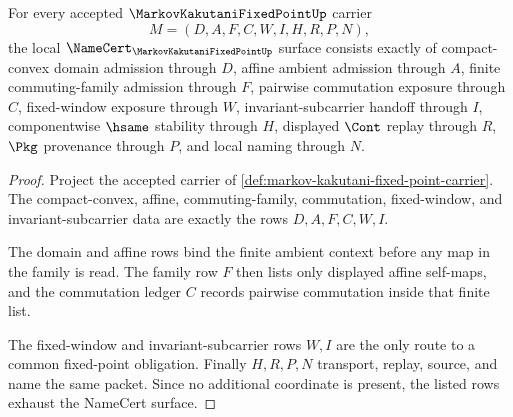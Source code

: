 \begin{theorem}\label{thm:markov-kakutani-fixed-point-obligation-surface}
For every accepted $\MarkovKakutaniFixedPointUp$ carrier
$$
M=(D,A,F,C,W,I,H,R,P,N),
$$
the local $\NameCert_{\MarkovKakutaniFixedPointUp}$ surface consists exactly of compact-convex domain admission through $D$, affine ambient admission through $A$, finite commuting-family admission through $F$, pairwise commutation exposure through $C$, fixed-window exposure through $W$, invariant-subcarrier handoff through $I$, componentwise $\hsame$ stability through $H$, displayed $\Cont$ replay through $R$, $\Pkg$ provenance through $P$, and local naming through $N$.
\end{theorem}
\begin{proof}
Project the accepted carrier of \autoref{def:markov-kakutani-fixed-point-carrier}. The compact-convex, affine, commuting-family, commutation, fixed-window, and invariant-subcarrier data are exactly the rows $D,A,F,C,W,I$.

The domain and affine rows bind the finite ambient context before any map in the family is read. The family row $F$ then lists only displayed affine self-maps, and the commutation ledger $C$ records pairwise commutation inside that finite list.

The fixed-window and invariant-subcarrier rows $W,I$ are the only route to a common fixed-point obligation. Finally $H,R,P,N$ transport, replay, source, and name the same packet. Since no additional coordinate is present, the listed rows exhaust the NameCert surface.
\end{proof}


